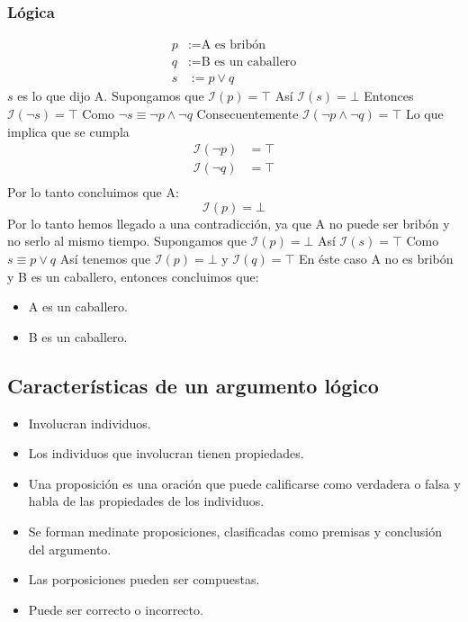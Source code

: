 \documentclass[a4paper]{article}
\begin{document}
\subsubsection{Lógica}
\noindent
\begin{align*}
    p &:= \text{A es bribón} \\
    q &:= \text{B es un caballero} \\
    s & := p \lor q 
\end{align*}
\(s\) es lo que dijo A.
\newline
Supongamos que \(\mathcal{I}\left(p\right) = \top\)
\newline 
Así \(\mathcal{I}\left(s\right) = \bot\)
\newline 
Entonces \(\mathcal{I}\left(\neg s\right) = \top\)
\newline
Como \(\neg s \equiv \neg p \land \neg q\)
\newline 
Consecuentemente \(\mathcal{I}\left(\neg p \land \neg q\right) = \top\)
\newline 
Lo que implica que se cumpla
\begin{align*}
    \mathcal{I}\left(\neg p\right) &= \top \\
    \mathcal{I}\left(\neg q\right) &= \top \\
\end{align*}
Por lo tanto concluimos que A:
\[
    \mathcal{I}\left(p\right) = \bot
\]
Por lo tanto hemos llegado a una contradicción, ya que A no puede ser bribón y no serlo al mismo tiempo.
\newline 
Supongamos que \(\mathcal{I}\left(p\right) = \bot\)
\newline 
Así \(\mathcal{I}\left(s\right) = \top\)
\newline
Como \( s \equiv p \lor q\)
\newline 
Así tenemos que \(\mathcal{I}\left(p\right) = \bot\) y \(\mathcal{I}\left(q\right) = \top\)
\newline 
En éste caso A no es bribón y B es un caballero, entonces concluimos que:
\begin{itemize}
    \item A es un caballero.
    \item B es un caballero.
\end{itemize} 
\subsection{Características de un argumento lógico}
\begin{itemize}
    \item Involucran individuos.
    \item Los individuos que involucran tienen propiedades.
    \item Una proposición es una oración que puede calificarse como verdadera o falsa y habla de las propiedades de los individuos.
    \item Se forman medinate proposiciones, clasificadas como premisas y conclusión del argumento.
    \item Las porposiciones pueden ser compuestas.
    \item Puede ser correcto o incorrecto.
\end{itemize}
\end{document}
